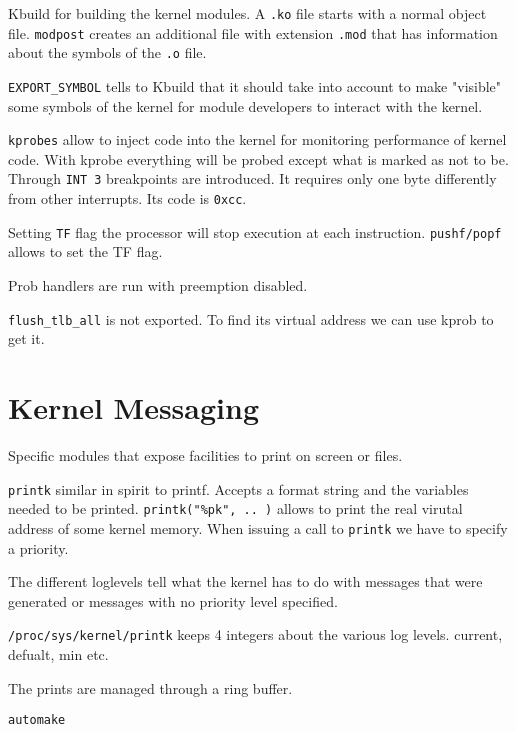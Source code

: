 \documentclass[twoside]{article}
\begin{document}
Kbuild for building the kernel modules. A \texttt{.ko} file starts with a normal
object file. \texttt{modpost} creates an additional file with extension
\texttt{.mod} that has information about the symbols of the \texttt{.o} file.


\texttt{EXPORT_SYMBOL} tells to Kbuild that it should take into account to make
"visible" some symbols of the kernel for module developers to interact with the
kernel.

\texttt{kprobes} allow to inject code into the kernel for monitoring performance
of kernel code. With kprobe everything will be probed except what is marked as
not to be. Through \texttt{INT 3} breakpoints are introduced. It requires only
one byte differently from other interrupts. Its code is \texttt{0xcc}.


Setting \texttt{TF} flag the processor will stop execution at each instruction.
\texttt{pushf/popf} allows to set the TF flag.

Prob handlers are run with preemption disabled.


\texttt{flush_tlb_all} is not exported. To find its virtual address we can use
kprob to get it.


\section{Kernel Messaging}
\label{sec:Kernel Messaging}


Specific modules that expose facilities to print on screen or files.

\texttt{printk} similar in spirit to printf. Accepts a format string and the
variables needed to be printed. \texttt{printk("\%pk", .. )} allows to print the real
virutal address of some kernel memory. When issuing a call to \texttt{printk} we
have to specify a priority.

The different loglevels tell what the kernel has to do with messages that were
generated or messages with no priority level specified.


\texttt{/proc/sys/kernel/printk} keeps 4 integers about the various log levels.
current, defualt, min etc.

The prints are managed through a ring buffer.



\texttt{automake}



\newpage


\end{document}
